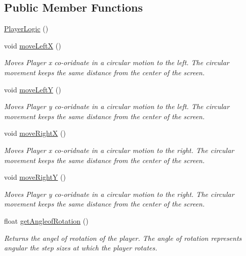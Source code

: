 \subsection*{Public Member Functions}
\begin{DoxyCompactItemize}
\item 
\hyperlink{class_player_logic_aa14c9bac512df3d01ea4db0224e82405}{Player\+Logic} ()
\item 
void \hyperlink{class_player_logic_ac4d252e80757e05b5799ab689ee27d5e}{move\+LeftX} ()
\begin{DoxyCompactList}\small\item\em Moves Player x co-\/oridnate in a circular motion to the left. The circular movement keeps the same distance from the center of the screen. \end{DoxyCompactList}\item 
void \hyperlink{class_player_logic_a006a7633ae5839d307bb90099f9d2745}{move\+LeftY} ()
\begin{DoxyCompactList}\small\item\em Moves Player y co-\/oridnate in a circular motion to the left. The circular movement keeps the same distance from the center of the screen. \end{DoxyCompactList}\item 
void \hyperlink{class_player_logic_a9c96291506bb5347f2c503bba4100fd4}{move\+RightX} ()
\begin{DoxyCompactList}\small\item\em Moves Player x co-\/oridnate in a circular motion to the right. The circular movement keeps the same distance from the center of the screen. \end{DoxyCompactList}\item 
void \hyperlink{class_player_logic_a4b77bba06ba630f974aaa85306109485}{move\+RightY} ()
\begin{DoxyCompactList}\small\item\em Moves Player y co-\/oridnate in a circular motion to the right. The circular movement keeps the same distance from the center of the screen. \end{DoxyCompactList}\item 
float \hyperlink{class_player_logic_a692b3e5b8f5b052e28dbb0fdb7dc634c}{get\+Angleof\+Rotation} ()
\begin{DoxyCompactList}\small\item\em Returns the angel of reotation of the player. The angle of rotation represents angular the step sizes at which the player rotates. \end{DoxyCompactList}\item 

\end{DoxyCompactItemize}
